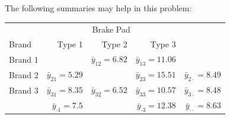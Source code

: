 \documentclass[addpoints]{examsetup}\usepackage[]{graphicx}\usepackage[]{color}
\begin{document}
\begin{questions}
The following summaries may help in this problem:



\begin{table}[h]
\centering
\begin{tabular}{lrrrr}
 & \multicolumn{3}{c}{Brake Pad} \\
\cline{2-4}
Brand   & Type 1                     & Type 2                      & Type 3                       &  \\
\cline{1-4} \cline{1-4}
Brand 1 &                                & $\bar{y}_{12} = 6.82$    & $\bar{y}_{13} = 11.06$   &                                \\
Brand 2 & $\bar{y}_{21} = 5.29$   &                                 & $\bar{y}_{23} = 15.51$   & $\bar{y}_{2 \cdot} = 8.49$ \\
Brand 3 & $\bar{y}_{31} = 8.35$   & $\bar{y}_{32} = 6.52$    & $\bar{y}_{33} = 10.57$   & $\bar{y}_{3 \cdot} = 8.48$ \\
\cline{1-4} 
        & $\bar{y}_{\cdot 1} = 7.5$ &                                 & $\bar{y}_{\cdot 3} = 12.38$   & $\bar{y}_{\cdot \cdot} = 8.63$ \\
\end{tabular}
\end{table}

\end{questions}
\end{document}
